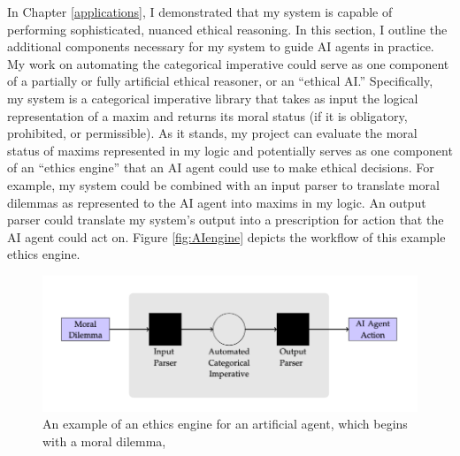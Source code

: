 %
\begin{isabellebody}%
%
%
\isadelimtheory
%
\endisadelimtheory
%
\isatagtheory
%
\endisatagtheory
{\isafoldtheory}%
%
\isadelimtheory
%
\endisadelimtheory
%
\isadelimdocument
%
\endisadelimdocument
%
\isatagdocument
%
\isamarkuptrue%
%
\isamarkuptrue%
%
\endisatagdocument
{\isafolddocument}%
%
\isadelimdocument
%
\endisadelimdocument
%
\begin{isamarkuptext}%
In Chapter \ref{applications}, I demonstrated that my system is capable of performing sophisticated,
nuanced ethical reasoning. In this section, I outline the additional components necessary for my system
to guide AI agents in practice. My work on automating the categorical imperative 
could serve as one component of a partially or fully artificial ethical reasoner, or an ``ethical AI.''
Specifically, my system is a categorical imperative library that takes as input the logical representation 
of a maxim and returns its moral status (if it is obligatory, prohibited, or permissible).
As it stands, my project can evaluate the moral status of maxims represented in my logic and potentially 
serves as one component of an ``ethics engine'' that an AI agent could use to make ethical decisions.
For example, my system could be combined with an input parser to translate moral dilemmas as represented 
to the AI agent into maxims in my logic. An output parser could translate my system's output
into a prescription for action that the AI agent could act on. Figure \ref{fig:AIengine} depicts the 
workflow of this example ethics engine.%
\end{isamarkuptext}\isamarkuptrue%
%
\begin{center}
\begin{figure}
\includegraphics[scale=0.43]{AI_engine.png}
\caption{An example of an ethics engine for an artificial agent, which begins with a moral dilemma, 
}
\end{figure}
\end{center}
\end{isabellebody}
